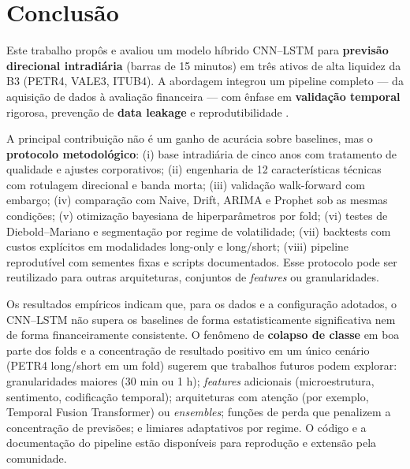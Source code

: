 \section{Conclusão}
\label{sec:conclusao}

Este trabalho propôs e avaliou um modelo híbrido CNN--LSTM para \textbf{previsão direcional intradiária} (barras de 15 minutos) em três ativos de alta liquidez da B3 (PETR4, VALE3, ITUB4). A abordagem integrou um pipeline completo --- da aquisição de dados à avaliação financeira --- com ênfase em \textbf{validação temporal} rigorosa, prevenção de \textbf{data leakage} e reprodutibilidade \cite{bergmeir2012,prado2018}.

A principal contribuição não é um ganho de acurácia sobre baselines, mas o \textbf{protocolo metodológico}: (i) base intradiária de cinco anos com tratamento de qualidade e ajustes corporativos; (ii) engenharia de 12 características técnicas com rotulagem direcional e banda morta; (iii) validação walk-forward com embargo; (iv) comparação com Naive, Drift, ARIMA e Prophet sob as mesmas condições; (v) otimização bayesiana de hiperparâmetros por fold; (vi) testes de Diebold--Mariano e segmentação por regime de volatilidade; (vii) backtests com custos explícitos em modalidades long-only e long/short; (viii) pipeline reprodutível com sementes fixas e scripts documentados. Esse protocolo pode ser reutilizado para outras arquiteturas, conjuntos de \emph{features} ou granularidades.

Os resultados empíricos indicam que, para os dados e a configuração adotados, o CNN--LSTM não supera os baselines de forma estatisticamente significativa nem de forma financeiramente consistente. O fenômeno de \textbf{colapso de classe} em boa parte dos folds e a concentração de resultado positivo em um único cenário (PETR4 long/short em um fold) sugerem que trabalhos futuros podem explorar: granularidades maiores (30 min ou 1 h); \emph{features} adicionais (microestrutura, sentimento, codificação temporal); arquiteturas com atenção (por exemplo, Temporal Fusion Transformer) ou \emph{ensembles}; funções de perda que penalizem a concentração de previsões; e limiares adaptativos por regime. O código e a documentação do pipeline estão disponíveis para reprodução e extensão pela comunidade.
